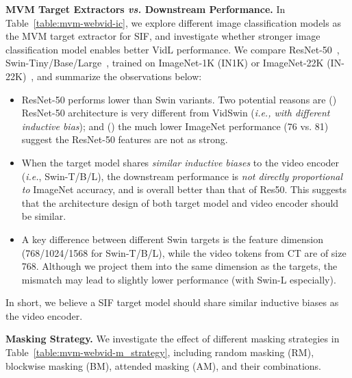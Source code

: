 \documentclass[10pt,twocolumn,letterpaper]{article}
\begin{document}
\vspace{0.5ex}
\noindent \textbf{MVM Target Extractors \textit{vs.} Downstream Performance.} In Table~\ref{table:mvm-webvid-ic}, we explore different image classification models as the MVM target extractor for SIF, and investigate whether stronger image classification model enables better VidL performance. We compare ResNet-50~\cite{he2016resnet}, Swin-Tiny/Base/Large~\cite{liu2021swin},  trained on ImageNet-1K (IN1K) or ImageNet-22K (IN-22K)~\cite{deng2009imagenet}, and summarize the observations below:
\begin{itemize}[leftmargin=*, topsep=1pt]
    \setlength\itemsep{-2pt}
    \item ResNet-50 performs lower than Swin variants. Two potential reasons are () ResNet-50 architecture is very different from 
    VidSwin (\textit{i.e., with different inductive bias}); and () the much lower ImageNet performance (76 vs. 81) suggest the ResNet-50 features are not as strong. 
    \item When the target model shares \textit{similar inductive biases} to the video encoder (\textit{i.e.}, Swin-T/B/L), the downstream performance is \textit{not directly proportional to} ImageNet accuracy, and is overall better than that of Res50. This suggests that the architecture design of both target model and video encoder should be similar. 
    \item A key difference between different Swin targets is the feature dimension (768/1024/1568 for Swin-T/B/L), while the video tokens from CT are of size 768. Although we project them into the same dimension as the targets, the mismatch may lead to slightly lower performance (with Swin-L especially). 
\end{itemize}
In short, we believe a SIF target model should share similar inductive biases as the video encoder. 

\vspace{0.5ex}
\noindent \textbf{Masking Strategy.}
We investigate the effect of different masking strategies in Table~\ref{table:mvm-webvid-m_strategy}, including random masking (RM), blockwise masking (BM), attended masking (AM), and their combinations. 
\end{document}
